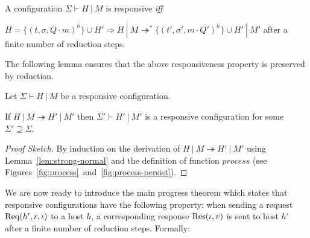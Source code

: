 \begin{defn}\label{def:resp-config}
  A configuration $\Sigma \vdash H~|~M$ is responsive {\em iff}

  $H = \{ (t, \sigma, Q \cdot m)^h \} \cup H' \Longrightarrow H~|~M \twoheadrightarrow^* \{ (t', \sigma', m \cdot Q')^h \} \cup H'~|~M'$ after a finite number of reduction steps.
\end{defn}

The following lemma ensures that the above responsiveness property is
preserved by reduction.

\begin{lem}[Responsiveness]\label{lem:resp}
  Let $\Sigma \vdash H~|~M$ be a responsive configuration.

  If $H~|~M \twoheadrightarrow H'~|~M'$ then $\Sigma' \vdash H'~|~M'$
  is a responsive configuration for some $\Sigma' \supseteq \Sigma$.
\end{lem}
\begin{proof}[Proof Sketch]
  By induction on the derivation of $H~|~M \twoheadrightarrow H'~|~M'$
  using Lemma~\ref{lem:strong-normal} and the definition of function
  $\mathit{process}$ (see
  Figures~\ref{fig:process}~and~\ref{fig:process-persist}).
\end{proof}

We are now ready to introduce the main progress theorem which states
that responsive configurations have the following property: when
sending a request ${\textrm{Req}(h', r, \iota)}$ to a host $h$, a corresponding
response ${\textrm{Res}(\iota, v)}$ is sent to host $h'$ after a finite number
of reduction steps. Formally:


